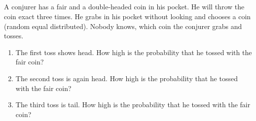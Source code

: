 \subsection{}
A conjurer has a fair and a double-headed coin in his pocket. He will throw the coin exact three times. He grabs in his pocket without looking and chooses a coin (random equal distributed). Nobody knows, which coin the conjurer grabs and tosses.
\begin{enumerate}
	\item The first toss shows head. How high is the probability that he tossed with the fair coin?
	\item The second toss is again head. How high is the probability that he tossed with the fair coin?
	\item The third toss is tail. How high is the probability that he tossed with the fair coin?
\end{enumerate}
